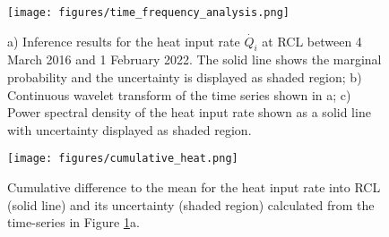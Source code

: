 \documentclass[doublespacing]{bmcart}
\begin{document}
\begin{backmatter}
\begin{figure}[h!]
 	\texttt{[image: figures/time\_frequency\_analysis.png]}  
    \caption{ a) Inference results for the heat input rate $\dot{Q_i}$ at RCL
             between 4 March 2016 and 1 February 2022. The solid line shows the
             marginal probability and the uncertainty is displayed as shaded
             region; b) Continuous wavelet transform of the time series shown in
             a; c) Power spectral density of the heat input rate shown as a
             solid line with uncertainty displayed as shaded region.}
\label{inference_result}
\end{figure}

\begin{figure}[h!]
 	\texttt{[image: figures/cumulative\_heat.png]}  
    \caption{Cumulative difference to the mean for the heat input rate into RCL
             (solid line) and its uncertainty (shaded region) calculated from
             the time-series in Figure \ref{inference_result}a.} 
\label{cumulative}
\end{figure}







\end{backmatter}
\end{document}
